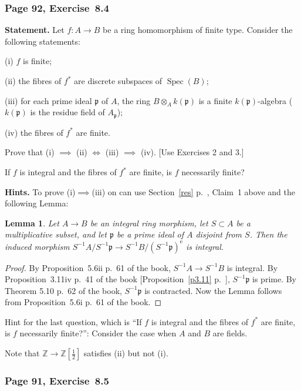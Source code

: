 \documentclass[12pt,letterpaper]{article}%
\newcommand{\oo}{\operatorname}\newcommand{\ooo}{\operatorname*}
\newcommand{\mf}{\mathfrak}
\newcommand{\ppp}{\mf p}
\newcommand{\Spec}{\operatorname{Spec}}\newcommand{\Sp}{\operatorname{Spec}}
\newcommand{\nn}{\noindent}
\newtheorem{lem}[thm]{Lemma}
\begin{document}
\subsubsection{Page 92, Exercise~8.4}%

\textbf{Statement.} Let $f:A\to B$ be a ring homomorphism of finite type. Consider the following statements:

\nn(i) $f$ is finite;

\nn(ii) the fibres of $f^*$ are discrete subspaces of $\Spec(B)$;

\nn(iii) for each prime ideal $\ppp$ of $A$, the ring $B\otimes_Ak(\ppp)$ is a finite $k(\ppp)$-algebra ($k(\ppp)$ is the residue field of $A_\ppp$);

\nn(iv) the fibres of $f^*$ are finite.

Prove that (i) $\implies$ (ii) $\iff$ (iii) $\implies$ (iv). [Use Exercises 2 and 3.]

If $f$ is integral and the fibres of $f^*$ are finite, is $f$ necessarily finite?

\nn\textbf{Hints.} To prove (i)$\implies$(iii) on can use Section~\ref{res} p.~\pageref{res}, Claim~1 above and the following Lemma:

\begin{lem}
Let $A\to B$ be an integral ring morphism, let $S\subset A$ be a multiplicative subset, and let $\ppp$ be a prime ideal of $A$ disjoint from $S$. Then the induced morphism $S^{-1}A/S^{-1}\ppp\to S^{-1}B/(S^{-1}\ppp)^{\oo e}$ is integral.
\end{lem} 
 
\begin{proof}
By Proposition~5.6ii p.~61 of the book, $S^{-1}A\to S^{-1}B$ is integral. By Proposition~3.11iv p.~41 of the book [Proposition~\ref{p3.11} p.~\pageref{p3.11}], $S^{-1}\ppp$ is prime. By Theorem 5.10 p.~62 of the book, $S^{-1}\ppp$ is contracted. Now the Lemma follows from Proposition~5.6i p.~61 of the book.
\end{proof}

Hint for the last question, which is ``If $f$ is integral and the fibres of $f^*$ are finite, is $f$ necessarily finite?'': Consider the case when $A$ and $B$ are fields. 

Note that $\mathbb Z\to\mathbb Z[\frac12]$ satisfies (ii) but not (i).

\subsubsection{Page 91, Exercise~8.5}%
\end{document}
